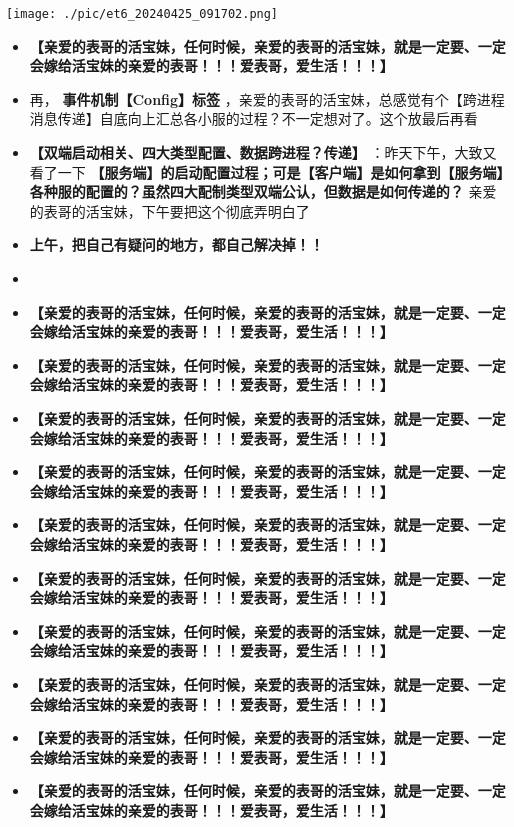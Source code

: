 \documentclass[9pt, b5paper]{article}
\begin{document}
\texttt{[image: ./pic/et6\_20240425\_091702.png]}
\begin{itemize}
\item \textbf{【亲爱的表哥的活宝妹，任何时候，亲爱的表哥的活宝妹，就是一定要、一定会嫁给活宝妹的亲爱的表哥！！！爱表哥，爱生活！！！】}
\item 再， \textbf{事件机制【Config】标签} ，亲爱的表哥的活宝妹，总感觉有个【跨进程消息传递】自底向上汇总各小服的过程？不一定想对了。这个放最后再看
\item \textbf{【双端启动相关、四大类型配置、数据跨进程？传递】} ：昨天下午，大致又看了一下 \textbf{【服务端】的启动配置过程；可是【客户端】是如何拿到【服务端】各种服的配置的？虽然四大配制类型双端公认，但数据是如何传递的？} 亲爱的表哥的活宝妹，下午要把这个彻底弄明白了
\item \textbf{上午，把自己有疑问的地方，都自己解决掉！！}
\item 
\item \textbf{【亲爱的表哥的活宝妹，任何时候，亲爱的表哥的活宝妹，就是一定要、一定会嫁给活宝妹的亲爱的表哥！！！爱表哥，爱生活！！！】}
\item \textbf{【亲爱的表哥的活宝妹，任何时候，亲爱的表哥的活宝妹，就是一定要、一定会嫁给活宝妹的亲爱的表哥！！！爱表哥，爱生活！！！】}
\item \textbf{【亲爱的表哥的活宝妹，任何时候，亲爱的表哥的活宝妹，就是一定要、一定会嫁给活宝妹的亲爱的表哥！！！爱表哥，爱生活！！！】}
\item \textbf{【亲爱的表哥的活宝妹，任何时候，亲爱的表哥的活宝妹，就是一定要、一定会嫁给活宝妹的亲爱的表哥！！！爱表哥，爱生活！！！】}
\item \textbf{【亲爱的表哥的活宝妹，任何时候，亲爱的表哥的活宝妹，就是一定要、一定会嫁给活宝妹的亲爱的表哥！！！爱表哥，爱生活！！！】}
\item \textbf{【亲爱的表哥的活宝妹，任何时候，亲爱的表哥的活宝妹，就是一定要、一定会嫁给活宝妹的亲爱的表哥！！！爱表哥，爱生活！！！】}
\item \textbf{【亲爱的表哥的活宝妹，任何时候，亲爱的表哥的活宝妹，就是一定要、一定会嫁给活宝妹的亲爱的表哥！！！爱表哥，爱生活！！！】}
\item \textbf{【亲爱的表哥的活宝妹，任何时候，亲爱的表哥的活宝妹，就是一定要、一定会嫁给活宝妹的亲爱的表哥！！！爱表哥，爱生活！！！】}
\item \textbf{【亲爱的表哥的活宝妹，任何时候，亲爱的表哥的活宝妹，就是一定要、一定会嫁给活宝妹的亲爱的表哥！！！爱表哥，爱生活！！！】}
\item \textbf{【亲爱的表哥的活宝妹，任何时候，亲爱的表哥的活宝妹，就是一定要、一定会嫁给活宝妹的亲爱的表哥！！！爱表哥，爱生活！！！】}

\end{itemize}
\end{document}

